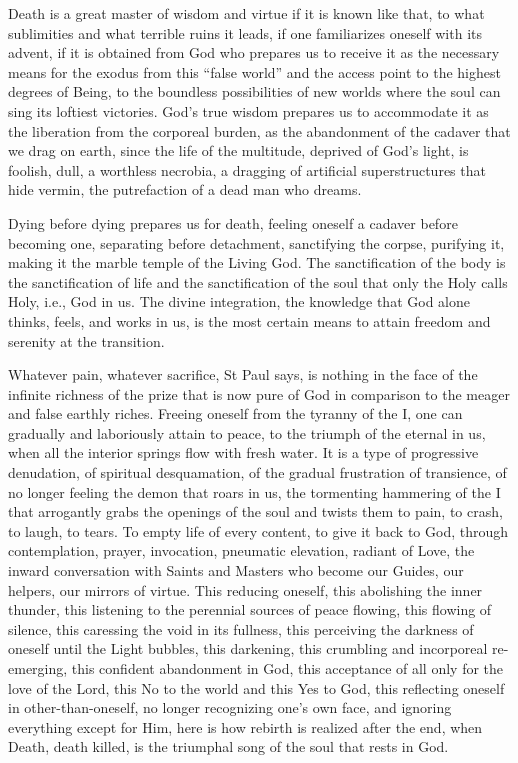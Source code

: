 Death is a great master of wisdom and virtue if it is known like that, to what sublimities and what terrible ruins it leads, if one familiarizes oneself with its advent, if it is obtained from God who prepares us to receive it as the necessary means for the exodus from this ``false world'' and the access point to the highest degrees of Being, to the boundless possibilities of new worlds where the soul can sing its loftiest victories. God's true wisdom prepares us to accommodate it as the liberation from the corporeal burden, as the abandonment of the cadaver that we drag on earth, since the life of the multitude, deprived of God's light, is foolish, dull, a worthless necrobia, a dragging of artificial superstructures that hide vermin, the putrefaction of a dead man who dreams.

Dying before dying prepares us for death, feeling oneself a cadaver before becoming one, separating before detachment, sanctifying the corpse, purifying it, making it the marble temple of the Living God. The sanctification of the body is the sanctification of life and the sanctification of the soul that only the Holy calls Holy, i.e., God in us. The divine integration, the knowledge that God alone thinks, feels, and works in us, is the most certain means to attain freedom and serenity at the transition.

Whatever pain, whatever sacrifice, St Paul says, is nothing in the face of the infinite richness of the prize that is now pure of God in comparison to the meager and false earthly riches. Freeing oneself from the tyranny of the I, one can gradually and laboriously attain to peace, to the triumph of the eternal in us, when all the interior springs flow with fresh water. It is a type of progressive denudation, of spiritual desquamation, of the gradual frustration of transience, of no longer feeling the demon that roars in us, the tormenting hammering of the I that arrogantly grabs the openings of the soul and twists them to pain, to crash, to laugh, to tears. To empty life of every content, to give it back to God, through contemplation, prayer, invocation, pneumatic elevation, radiant of Love, the inward conversation with Saints and Masters who become our Guides, our helpers, our mirrors of virtue. This reducing oneself, this abolishing the inner thunder, this listening to the perennial sources of peace flowing, this flowing of silence, this caressing the void in its fullness, this perceiving the darkness of oneself until the Light bubbles, this darkening, this crumbling and incorporeal re-emerging, this confident abandonment in God, this acceptance of all only for the love of the Lord, this No to the world and this Yes to God, this reflecting oneself in other-than-oneself, no longer recognizing one's own face, and ignoring everything except for Him, here is how rebirth is realized after the end, when Death, death killed, is the triumphal song of the soul that rests in God.

